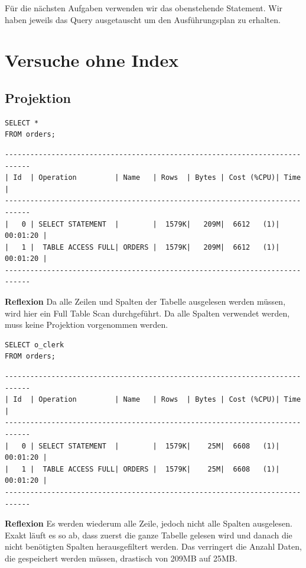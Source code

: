 \documentclass[10pt]{article}
\begin{document}
Für die nächsten Aufgaben verwenden wir das obenstehende Statement. Wir 
haben jeweils das Query ausgetauscht um den Ausführungsplan zu erhalten.

\section{Versuche ohne Index}
\subsection{Projektion}
\begin{lstlisting}[style=sql]
SELECT *
FROM orders;
\end{lstlisting}
\begin{lstlisting}[style=queryexecutionplan]
----------------------------------------------------------------------------
| Id  | Operation         | Name   | Rows  | Bytes | Cost (%CPU)| Time     |
----------------------------------------------------------------------------
|   0 | SELECT STATEMENT  |        |  1579K|   209M|  6612   (1)| 00:01:20 |
|   1 |  TABLE ACCESS FULL| ORDERS |  1579K|   209M|  6612   (1)| 00:01:20 |
---------------------------------------------------------------------------- 
\end{lstlisting}   
\textbf{Reflexion} \newline
Da alle Zeilen und Spalten der Tabelle ausgelesen werden müssen, wird hier ein
Full Table Scan durchgeführt. Da alle Spalten verwendet werden, muss keine Projektion 
vorgenommen werden.

\begin{lstlisting}[style=sql]
SELECT o_clerk
FROM orders;
\end{lstlisting}
\begin{lstlisting}[style=queryexecutionplan]
----------------------------------------------------------------------------
| Id  | Operation         | Name   | Rows  | Bytes | Cost (%CPU)| Time     |
----------------------------------------------------------------------------
|   0 | SELECT STATEMENT  |        |  1579K|    25M|  6608   (1)| 00:01:20 |
|   1 |  TABLE ACCESS FULL| ORDERS |  1579K|    25M|  6608   (1)| 00:01:20 |
---------------------------------------------------------------------------- 
\end{lstlisting}   
\textbf{Reflexion} \newline
Es werden wiederum alle Zeile, jedoch nicht alle Spalten ausgelesen.
Exakt läuft es so ab, dass zuerst die ganze Tabelle gelesen wird und danach die nicht
benötigten Spalten herausgefiltert werden.
Das verringert die Anzahl Daten, die gespeichert werden müssen, drastisch von 209MB auf 25MB.
\end{document}
